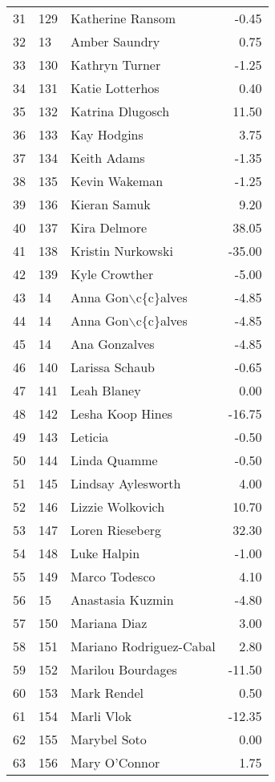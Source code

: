 \begin{table}[ht]
\begin{tabular}{rllr}
  31 & 129 & Katherine Ransom & -0.45 \\ 
  32 & 13 & Amber Saundry & 0.75 \\ 
  33 & 130 & Kathryn Turner & -1.25 \\ 
  34 & 131 & Katie Lotterhos & 0.40 \\ 
  35 & 132 & Katrina Dlugosch & 11.50 \\ 
  36 & 133 & Kay Hodgins & 3.75 \\ 
  37 & 134 & Keith Adams & -1.35 \\ 
  38 & 135 & Kevin Wakeman & -1.25 \\ 
  39 & 136 & Kieran Samuk & 9.20 \\ 
  40 & 137 & Kira Delmore & 38.05 \\ 
  41 & 138 & Kristin Nurkowski & -35.00 \\ 
  42 & 139 & Kyle Crowther & -5.00 \\ 
  43 & 14 & Anna Gon$\backslash$c\{c\}alves & -4.85 \\ 
  44 & 14 & Anna Gon$\backslash$c\{c\}alves & -4.85 \\ 
  45 & 14 & Ana Gonzalves & -4.85 \\ 
  46 & 140 & Larissa Schaub & -0.65 \\ 
  47 & 141 & Leah Blaney & 0.00 \\ 
  48 & 142 & Lesha Koop Hines & -16.75 \\ 
  49 & 143 & Leticia & -0.50 \\ 
  50 & 144 & Linda Quamme & -0.50 \\ 
  51 & 145 & Lindsay Aylesworth & 4.00 \\ 
  52 & 146 & Lizzie Wolkovich & 10.70 \\ 
  53 & 147 & Loren Rieseberg & 32.30 \\ 
  54 & 148 & Luke Halpin & -1.00 \\ 
  55 & 149 & Marco Todesco & 4.10 \\ 
  56 & 15 & Anastasia Kuzmin & -4.80 \\ 
  57 & 150 & Mariana Diaz & 3.00 \\ 
  58 & 151 & Mariano Rodriguez-Cabal & 2.80 \\ 
  59 & 152 & Marilou Bourdages & -11.50 \\ 
  60 & 153 & Mark Rendel & 0.50 \\ 
  61 & 154 & Marli Vlok & -12.35 \\ 
  62 & 155 & Marybel Soto & 0.00 \\ 
  63 & 156 & Mary O'Connor & 1.75 \\ 

\end{tabular}
\end{table}
